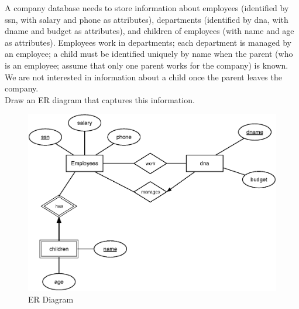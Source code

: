 \begin{problem}{2.4}

  A company database needs to store information about employees (identified by ssn, with salary and phone as
  attributes), departments (identified by dna, with dname and budget as attributes), and children of employees (with
  name and age as attributes). Employees work in departments; each department is managed by an employee; a child must be
  identified uniquely by name when the parent (who is an employee; assume that only one parent works for the company) is
  known. We are not interested in information about a child once the parent leaves the company. \\

  \noindent Draw an ER diagram that captures this information.

  \begin{solution}
    \begin{figure}[H]
      \centering
      \caption{ER Diagram}
      \includegraphics[scale=.5]{2_4.eps}
    \end{figure}
  \end{solution}
\end{problem} \newpage

